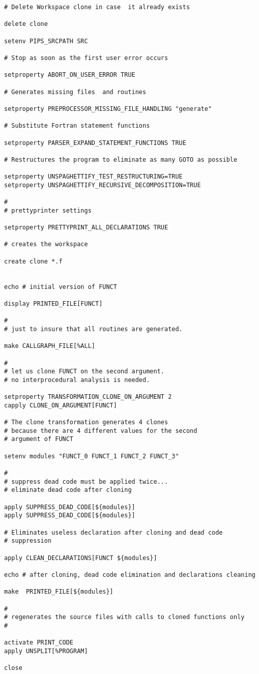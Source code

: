 \documentclass[a4paper,12pt]{article}
\begin{document}
\begin{verbatim}
# Delete Workspace clone in case  it already exists

delete clone                      

setenv PIPS_SRCPATH SRC

# Stop as soon as the first user error occurs

setproperty ABORT_ON_USER_ERROR TRUE   

# Generates missing files  and routines 

setproperty PREPROCESSOR_MISSING_FILE_HANDLING "generate" 

# Substitute Fortran statement functions

setproperty PARSER_EXPAND_STATEMENT_FUNCTIONS TRUE

# Restructures the program to eliminate as many GOTO as possible

setproperty UNSPAGHETTIFY_TEST_RESTRUCTURING=TRUE
setproperty UNSPAGHETTIFY_RECURSIVE_DECOMPOSITION=TRUE

#
# prettyprinter settings

setproperty PRETTYPRINT_ALL_DECLARATIONS TRUE

# creates the workspace

create clone *.f


echo # initial version of FUNCT

display PRINTED_FILE[FUNCT]

#
# just to insure that all routines are generated.

make CALLGRAPH_FILE[%ALL]

#
# let us clone FUNCT on the second argument. 
# no interprocedural analysis is needed. 

setproperty TRANSFORMATION_CLONE_ON_ARGUMENT 2
capply CLONE_ON_ARGUMENT[FUNCT]

# The clone transformation generates 4 clones
# because there are 4 different values for the second
# argument of FUNCT

setenv modules "FUNCT_0 FUNCT_1 FUNCT_2 FUNCT_3"

#
# suppress dead code must be applied twice...
# eliminate dead code after cloning

apply SUPPRESS_DEAD_CODE[${modules}]
apply SUPPRESS_DEAD_CODE[${modules}]

# Eliminates useless declaration after cloning and dead code
# suppression

apply CLEAN_DECLARATIONS[FUNCT ${modules}]

echo # after cloning, dead code elimination and declarations cleaning

make  PRINTED_FILE[${modules}]

#
# regenerates the source files with calls to cloned functions only
# 

activate PRINT_CODE
apply UNSPLIT[%PROGRAM]

close 
\end{verbatim}
\end{document}
